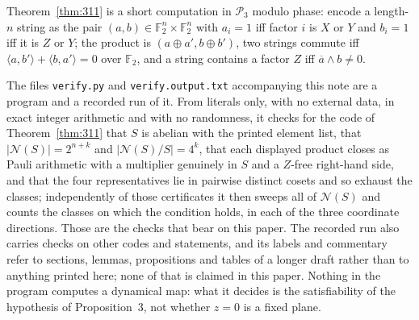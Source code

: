 \documentclass[11pt]{amsart}
\theoremstyle{remark}
\theoremstyle{definition}
\newcommand{\PP}{\mathcal P}
\newcommand{\NN}{\mathcal N}
\newcommand{\str}[1]{\texttt{#1}}
\begin{document}
Theorem~\ref{thm:311} is a short computation in $\PP_3$ modulo phase: encode a
length-$n$ string as the pair $(a,b)\in\mathbb F_2^n\times\mathbb F_2^n$ with $a_i=1$ iff factor $i$
is $X$ or $Y$ and $b_i=1$ iff it is $Z$ or $Y$; the product is $(a\oplus a',b\oplus b')$, two
strings commute iff $\langle a,b'\rangle+\langle b,a'\rangle=0$ over $\mathbb F_2$, and a string
contains a factor $Z$ iff $\overline a\wedge b\neq0$.

The files \str{verify.py} and \str{verify.output.txt} accompanying this note are a program and a
recorded run of it. From literals only, with no external data, in exact integer arithmetic and with
no randomness, it checks for the code of Theorem~\ref{thm:311} that $S$ is abelian with the printed
element list, that $|\NN(S)|=2^{n+k}$ and $|\NN(S)/S|=4^k$, that each displayed product closes as
Pauli arithmetic with a multiplier genuinely in $S$ and a $Z$-free right-hand side, and that the four
representatives lie in pairwise distinct cosets and so exhaust the classes; independently of those
certificates it then sweeps all of $\NN(S)$ and counts the classes on which the condition holds, in
each of the three coordinate directions. Those are the checks that bear on this paper. The recorded
run also carries checks on other codes and statements, and its labels and commentary refer to
sections, lemmas, propositions and tables of a longer draft rather than to anything printed here;
none of that is claimed in this paper. Nothing in the program computes a dynamical map: what it
decides is the satisfiability of the hypothesis of Proposition~3, not whether $z=0$ is a fixed plane.
\end{document}
